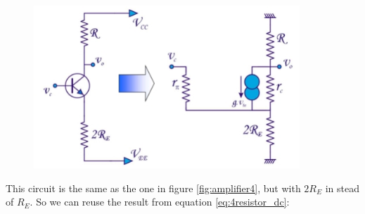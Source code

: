 \begin{figure}[h!]
	\centering
	\includegraphics[width=10cm]{figures/ch02/diff_amp9.jpg}
	\caption{}
	\label{fig:diff_amp9}
\end{figure}

This circuit is the same as the one in figure \ref{fig:amplifier4}, but with $2 R_E$ in stead of $R_E$. So we can reuse the result from equation \ref{eq:4resistor_dc}:

